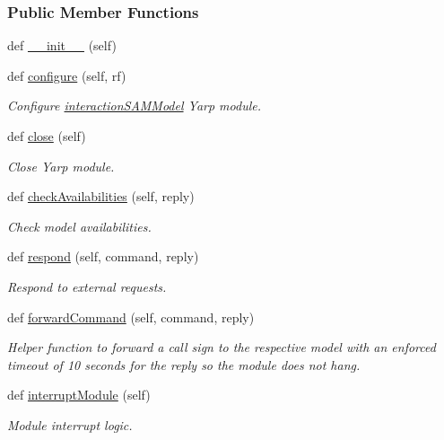 \subsubsection*{Public Member Functions}
\begin{DoxyCompactItemize}
\item 
def \hyperlink{group__icubclient__SAM__Core_a4133a020401ec002c61a3b57cd84de5d}{\+\_\+\+\_\+init\+\_\+\+\_\+} (self)
\item 
def \hyperlink{group__icubclient__SAM__Core_a866d1dd31bbf562be8f89a7c77531ea0}{configure} (self, rf)
\begin{DoxyCompactList}\small\item\em Configure \hyperlink{namespaceSAM_1_1SAM__Core_1_1interactionSAMModel}{interaction\+S\+A\+M\+Model} Yarp module. \end{DoxyCompactList}\item 
def \hyperlink{group__icubclient__SAM__Core_a6bf831278fec5295fd322c6b8108ad2d}{close} (self)
\begin{DoxyCompactList}\small\item\em Close Yarp module. \end{DoxyCompactList}\item 
def \hyperlink{group__icubclient__SAM__Core_aba9c86c4df4a79b54de5194c24f713e3}{check\+Availabilities} (self, reply)
\begin{DoxyCompactList}\small\item\em Check model availabilities. \end{DoxyCompactList}\item 
def \hyperlink{group__icubclient__SAM__Core_ad7eb8bb6937e3837b41c50a0bf7e1c59}{respond} (self, command, reply)
\begin{DoxyCompactList}\small\item\em Respond to external requests. \end{DoxyCompactList}\item 
def \hyperlink{group__icubclient__SAM__Core_a6722f96c337b111bb5ac88995577cf66}{forward\+Command} (self, command, reply)
\begin{DoxyCompactList}\small\item\em Helper function to forward a call sign to the respective model with an enforced timeout of 10 seconds for the reply so the module does not hang. \end{DoxyCompactList}\item 
def \hyperlink{group__icubclient__SAM__Core_af5fb48637f8b03290e8cb46d21e1b7e8}{interrupt\+Module} (self)
\begin{DoxyCompactList}\small\item\em Module interrupt logic. \end{DoxyCompactList}\item 

\end{DoxyCompactItemize}
